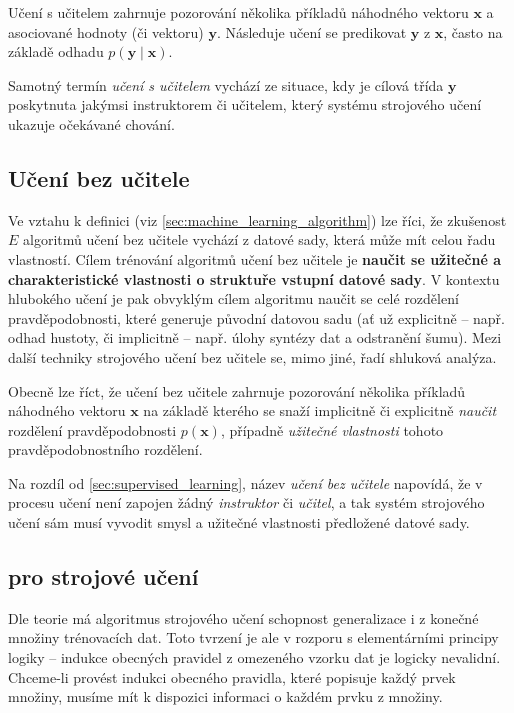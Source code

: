 Učení s učitelem zahrnuje pozorování několika příkladů náhodného vektoru $\mathbf{x}$ a asociované hodnoty (či vektoru) $\mathbf{y}$.
Následuje učení se predikovat $\mathbf{y}$ z $\mathbf{x}$, často na základě odhadu $p(\mathbf{y}\mid\mathbf{x})$.

Samotný termín \emph{učení s učitelem} vychází ze situace, kdy je cílová třída $\mathbf{y}$ poskytnuta jakýmsi instruktorem či učitelem, který systému strojového učení ukazuje očekávané chování. \cite{Goodfellow2016}
\subsection{Učení bez učitele}
Ve vztahu k definici (viz \autoref{sec:machine_learning_algorithm}) lze říci, že zkušenost $E$ algoritmů učení bez učitele vychází z datové sady, která může mít celou řadu vlastností.
Cílem trénování algoritmů učení bez učitele je \textbf{naučit se užitečné a charakteristické vlastnosti o struktuře vstupní datové sady}.
V kontextu hlubokého učení je pak obvyklým cílem algoritmu naučit se celé rozdělení pravděpodobnosti, které generuje původní datovou sadu (ať už explicitně – např. odhad hustoty, či implicitně – např. úlohy syntézy dat a odstranění šumu).
Mezi další techniky strojového učení bez učitele se, mimo jiné, řadí shluková analýza.

Obecně lze říct, že učení bez učitele zahrnuje pozorování několika příkladů náhodného vektoru $\mathbf{x}$ na základě kterého se snaží implicitně či explicitně \emph{naučit} rozdělení pravděpodobnosti $p(\mathbf{x})$, případně \emph{užitečné vlastnosti} tohoto pravděpodobnostního rozdělení.

Na rozdíl od \autoref{sec:supervised_learning}, název \emph{učení bez učitele} napovídá, že v procesu učení není zapojen žádný \emph{instruktor} či \emph{učitel}, a tak systém strojového učení sám musí vyvodit smysl a užitečné vlastnosti předložené datové sady. \cite{Goodfellow2016}
\subsection{ pro strojové učení}
\label{sec:no_free_lunch}
Dle teorie má algoritmus strojového učení schopnost generalizace i z konečné množiny trénovacích dat. 
Toto tvrzení je ale v rozporu s elementárními principy logiky – indukce obecných pravidel z omezeného vzorku dat je logicky nevalidní.
Chceme-li provést indukci obecného pravidla, které popisuje každý prvek množiny, musíme mít k dispozici informaci o každém prvku z množiny.  \cite{Goodfellow2016}

